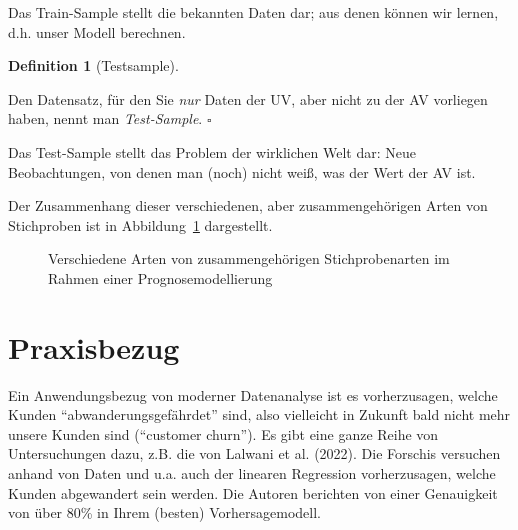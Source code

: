 \documentclass[
  letterpaper,
]{scrbook}
\theoremstyle{definition}
\theoremstyle{definition}
\newtheorem{definition}{Definition}[chapter]
\theoremstyle{definition}
\theoremstyle{remark}
\begin{document}
Das Train-Sample stellt die bekannten Daten dar; aus denen können wir
lernen, d.h. unser Modell berechnen.

\begin{definition}[Testsample]\protect\hypertarget{def-testsample}{}\label{def-testsample}

Den Datensatz, für den Sie \emph{nur} Daten der UV, aber nicht zu der AV
vorliegen haben, nennt man \emph{Test-Sample}. \(\square\)

\end{definition}

Das Test-Sample stellt das Problem der wirklichen Welt dar: Neue
Beobachtungen, von denen man (noch) nicht weiß, was der Wert der AV ist.

Der Zusammenhang dieser verschiedenen, aber zusammengehörigen Arten von
Stichproben ist in Abbildung~\ref{fig-sample-types} dargestellt.

\begin{figure}


\caption{\label{fig-sample-types}Verschiedene Arten von
zusammengehörigen Stichprobenarten im Rahmen einer Prognosemodellierung}

\end{figure}%

\section{Praxisbezug}\label{praxisbezug-4}

Ein Anwendungsbezug von moderner Datenanalyse ist es vorherzusagen,
welche Kunden ``abwanderungsgefährdet'' sind, also vielleicht in Zukunft
bald nicht mehr unsere Kunden sind (``customer churn''). Es gibt eine
ganze Reihe von Untersuchungen dazu, z.B. die von Lalwani et al. (2022).
Die Forschis versuchen anhand von Daten und u.a. auch der linearen
Regression vorherzusagen, welche Kunden abgewandert sein werden. Die
Autoren berichten von einer Genauigkeit von über 80\% in Ihrem (besten)
Vorhersagemodell.
\end{document}
